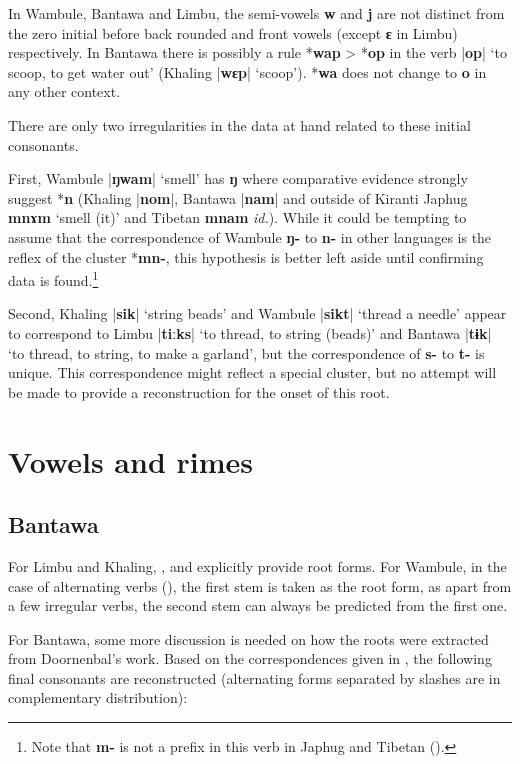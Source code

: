 \documentclass[oldfontcommands,oneside,a4paper,11pt]{article}
\newcommand{\ipa}[1]{\textbf{{\phon\mbox{#1}}}} %
\newcommand{\dhatu}[2]{|\ipa{#1}| `#2'}
\begin{document}
In Wambule, Bantawa and Limbu, the semi-vowels \ipa{w} and \ipa{j} are not distinct from the zero initial before back rounded and front vowels (except \ipa{ɛ} in Limbu) respectively. In Bantawa there is possibly a rule *\ipa{wap} > *\ipa{op} in the verb \dhatu{op}{to scoop, to get water out} (Khaling \dhatu{wɛp}{scoop}). *\ipa{wa} does not change to \ipa{o} in any other context.

There are only two irregularities in the data at hand related to these initial consonants.

First, Wambule \dhatu{ŋwam}{smell} has \ipa{ŋ} where comparative evidence strongly suggest *\ipa{n} (Khaling |\ipa{nom}|, Bantawa  |\ipa{nam}| and outside of Kiranti Japhug \ipa{mnɤm} `smell (it)' and Tibetan \ipa{mnam} \textit{id.}). While it could be tempting to assume that the correspondence of Wambule \ipa{ŋ-} to \ipa{n-} in other languages is the reflex of the cluster *\ipa{mn-}, this hypothesis is better left aside until confirming data is found.\footnote{Note that \ipa{m-} is not a prefix in this verb in Japhug and Tibetan (\citealt{hill14derivational, jacques14snom}).}

Second, Khaling \dhatu{sik}{string beads} and Wambule \dhatu{sikt}{thread a needle} appear to correspond to Limbu \dhatu{tiːks}{to thread, to string (beads)}  and Bantawa \dhatu{tɨk}{to thread, to string, to make a garland}, but the correspondence of \ipa{s-} to \ipa{t-} is unique. This correspondence might reflect a special cluster, but no attempt will be made to provide a reconstruction for the onset of this root.

\section{Vowels and rimes} \label{sec:rhymes}

\subsection{Bantawa} \label{sec:bantawa}
 
 For Limbu and Khaling, \citet{michailovsky02dico}, \citet{jacques12khaling} and \citet{jacques16si} explicitly provide root forms. For Wambule, in the case of alternating verbs (\citealt[255-263]{opgenort04wambule}), the first stem is taken as the root form, as apart from a few irregular verbs, the second stem can always be predicted from the first one.  
 
 For Bantawa, some more discussion is needed on how the roots were extracted from Doornenbal's work. Based on the correspondences given in \citet[129; 132]{doornenbal09}, the following final consonants are reconstructed (alternating forms separated by slashes are in complementary distribution):
\end{document}
